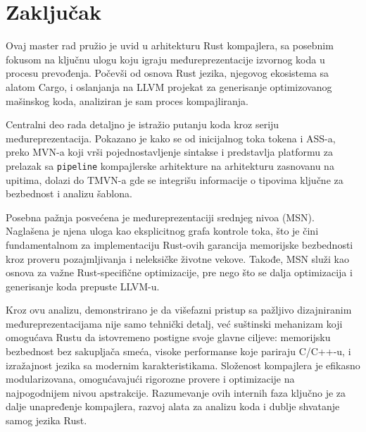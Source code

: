 \section{Zaključak}

Ovaj master rad pružio je uvid u arhitekturu Rust kompajlera, sa posebnim fokusom na ključnu ulogu koju igraju međureprezentacije izvornog koda u procesu prevođenja. 
Počevši od osnova Rust jezika, njegovog ekosistema sa alatom Cargo, i oslanjanja na LLVM projekat za generisanje optimizovanog mašinskog koda, 
analiziran je sam proces kompajliranja.

Centralni deo rada detaljno je istražio putanju koda kroz seriju međureprezentacija. 
Pokazano je kako se od inicijalnog toka tokena i ASS-a, preko MVN-a koji vrši pojednostavljenje sintakse i predstavlja platformu za prelazak sa \verb|pipeline|
kompajlerske arhitekture na arhitekturu zasnovanu na upitima, dolazi do TMVN-a gde se integrišu informacije o tipovima ključne za bezbednost 
i analizu šablona.

Posebna pažnja posvećena je međureprezentaciji srednjeg nivoa (MSN). Naglašena je njena uloga kao eksplicitnog grafa kontrole toka,
što je čini fundamentalnom za implementaciju Rust-ovih garancija memorijske bezbednosti kroz proveru pozajmljivanja i neleksičke životne vekove.
Takođe, MSN služi kao osnova za važne Rust-specifične optimizacije, pre nego što se dalja optimizacija i generisanje koda prepuste LLVM-u.

Kroz ovu analizu, demonstrirano je da višefazni pristup sa pažljivo dizajniranim međureprezentacijama nije samo tehnički detalj,
već suštinski mehanizam koji omogućava Rustu da istovremeno postigne svoje glavne ciljeve: memorijsku bezbednost bez sakupljača smeća,
visoke performanse koje pariraju C/C++-u, i izražajnost jezika sa modernim karakteristikama. Složenost kompajlera je efikasno modularizovana,
omogućavajući rigorozne provere i optimizacije na najpogodnijem nivou apstrakcije. Razumevanje ovih internih faza ključno je za dalje unapređenje kompajlera,
razvoj alata za analizu koda i dublje shvatanje samog jezika Rust.